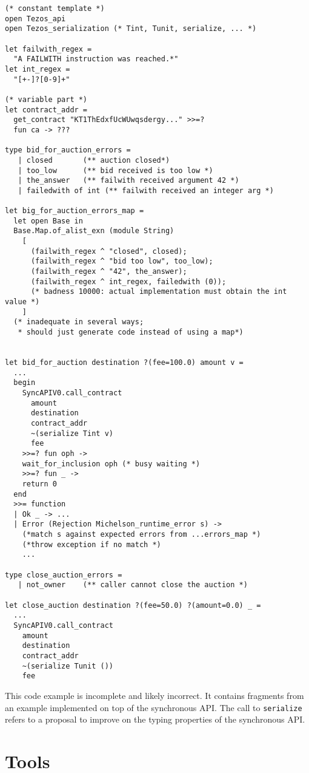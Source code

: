\documentclass[a4paper]{llncs}
\begin{document}
\begin{lstlisting}[caption={Generated implementation},label={lst:generated-implementation}]
(* constant template *)
open Tezos_api
open Tezos_serialization (* Tint, Tunit, serialize, ... *)

let failwith_regex = 
  "A FAILWITH instruction was reached.*"
let int_regex = 
  "[+-]?[0-9]+"

(* variable part *)
let contract_addr = 
  get_contract "KT1ThEdxfUcWUwqsdergy..." >>=? 
  fun ca -> ???

type bid_for_auction_errors = 
   | closed       (** auction closed*)
   | too_low      (** bid received is too low *)
   | the_answer   (** failwith received argument 42 *)
   | failedwith of int (** failwith received an integer arg *)

let big_for_auction_errors_map =
  let open Base in
  Base.Map.of_alist_exn (module String)
    [
      (failwith_regex ^ "closed", closed);
      (failwith_regex ^ "bid too low", too_low);
      (failwith_regex ^ "42", the_answer);
      (failwith_regex ^ int_regex, failedwith (0)); 
      (* badness 10000: actual implementation must obtain the int value *)
    ]
  (* inadequate in several ways;
   * should just generate code instead of using a map*)
  

let bid_for_auction destination ?(fee=100.0) amount v =
  ...
  begin
    SyncAPIV0.call_contract
      amount
      destination
      contract_addr
      ~(serialize Tint v)
      fee
    >>=? fun oph ->
    wait_for_inclusion oph (* busy waiting *)
    >>=? fun _ ->
    return 0
  end
  >>= function
  | Ok _ -> ...
  | Error (Rejection Michelson_runtime_error s) -> 
    (*match s against expected errors from ...errors_map *)
    (*throw exception if no match *)
    ...

type close_auction_errors = 
   | not_owner    (** caller cannot close the auction *)

let close_auction destination ?(fee=50.0) ?(amount=0.0) _ =
  ...
  SyncAPIV0.call_contract
    amount
    destination
    contract_addr
    ~(serialize Tunit ())
    fee
\end{lstlisting}
This code example is incomplete and likely incorrect. It contains
fragments from an example implemented on top of the synchronous API.
The call to \lstinline/serialize/ refers to a proposal to improve on
the typing properties of the synchronous API.

\clearpage
\section{Tools}
\label{sec:tools}
\end{document}
